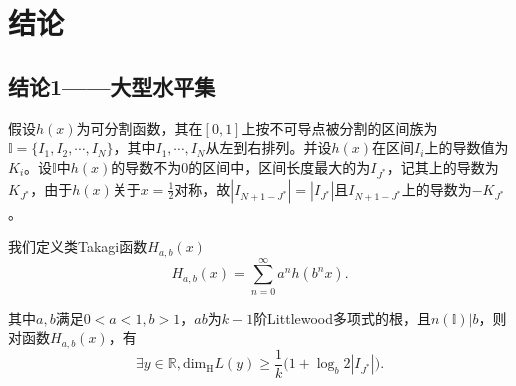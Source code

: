 \section{结论}

\subsection{结论1——大型水平集}

假设$h(x)$为可分割函数，其在$[0,1]$上按不可导点被分割的区间族为$\mathbb{I}=\{I_1,I_2,\cdots,I_N\}$，其中$I_1,\cdots,I_N$从左到右排列。并设$h(x)$在区间$I_i$上的导数值为$K_i$。设$\mathbb{I}$中$h(x)$的导数不为$0$的区间中，区间长度最大的为$I_{J^*}$，记其上的导数为$K_{J^*}$，由于$h(x)$关于$x=\frac{1}{2}$对称，故$|I_{N+1-J^*}|=|I_{J^*}|$且$I_{N+1-J^*} $上的导数为$-K_{J^*}$。

我们定义类Takagi函数$H_{a,b}(x)$
$$
      H_{a,b}(x)=\sum_{n=0}^\infty a^nh(b^nx).
$$

其中$a,b$满足$0<a<1,b>1$，$ab$为$k-1$阶Littlewood多项式的根，且$n(\mathbb{I})|b$，则对函数$H_{a,b}(x)$，有
$$
      \exists y\in\mathbb{R},\mathrm{dim_H}L(y)\ge\frac{1}{k}\Big(1+\log_b2|I_{J^*}|\Big).
$$

